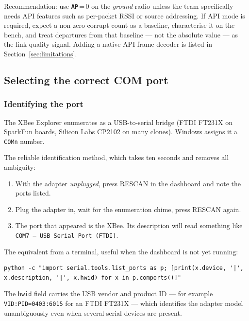 \documentclass[11pt,a4paper]{article}
\newcommand{\code}[1]{\texttt{#1}}
\newcommand{\param}[1]{\textbf{\texttt{#1}}}
\begin{document}
Recommendation: use \param{AP}\,=\,0 on the \emph{ground} radio unless the
team specifically needs API features such as per-packet RSSI or source
addressing. If API mode is required, expect a non-zero corrupt count as a
baseline, characterise it on the bench, and treat departures from that
baseline --- not the absolute value --- as the link-quality signal. Adding a
native API frame decoder is listed in Section~\ref{sec:limitations}.

\subsection{Selecting the correct COM port}
\label{sec:comport}

\subsubsection{Identifying the port}

The XBee Explorer enumerates as a USB-to-serial bridge (FTDI FT231X on
SparkFun boards, Silicon Labs CP2102 on many clones). Windows assigns it a
\code{COMn} number.

The reliable identification method, which takes ten seconds and removes all
ambiguity:

\begin{enumerate}
  \item With the adapter \emph{unplugged}, press \textsf{RESCAN} in the
        dashboard and note the ports listed.
  \item Plug the adapter in, wait for the enumeration chime, press
        \textsf{RESCAN} again.
  \item The port that appeared is the XBee. Its description will read
        something like \code{COM7 --- USB Serial Port (FTDI)}.
\end{enumerate}

The equivalent from a terminal, useful when the dashboard is not yet running:

\begin{lstlisting}[style=gcsshell,caption={Enumerating serial ports from the command line.}]
python -c "import serial.tools.list_ports as p; [print(x.device, '|', x.description, '|', x.hwid) for x in p.comports()]"
\end{lstlisting}

The \code{hwid} field carries the USB vendor and product ID --- for example
\code{VID:PID=0403:6015} for an FTDI FT231X --- which identifies the adapter
model unambiguously even when several serial devices are present.
\end{document}
